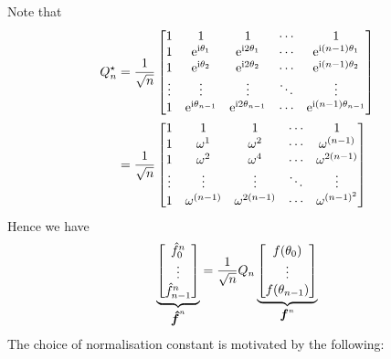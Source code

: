 Note that
\begin{align*}
Q_n^\ensuremath{\star} &= {1 \over \sqrt{n}} \begin{bmatrix}
1 & 1 & 1&  \ensuremath{\cdots} & 1 \\
1 & {\rm e}^{{\rm i} \ensuremath{\theta}_1} & {\rm e}^{{\rm i} 2 \ensuremath{\theta}_1} & \ensuremath{\cdots} & {\rm e}^{{\rm i} (n-1) \ensuremath{\theta}_1} \\
1 &  {\rm e}^{{\rm i} \ensuremath{\theta}_2}  & {\rm e}^{{\rm i} 2 \ensuremath{\theta}_2} & \ensuremath{\cdots} & {\rm e}^{{\rm i} (n-1)\ensuremath{\theta}_2} \\
\ensuremath{\vdots} & \ensuremath{\vdots} & \ensuremath{\vdots} & \ensuremath{\ddots} & \ensuremath{\vdots} \\
1 & {\rm e}^{{\rm i} \ensuremath{\theta}_{n-1}} & {\rm e}^{{\rm i} 2 \ensuremath{\theta}_{n-1}} & \ensuremath{\cdots} & {\rm e}^{{\rm i} (n-1) \ensuremath{\theta}_{n-1}}
\end{bmatrix} \\
&= {1 \over \sqrt{n}} \begin{bmatrix}
1 & 1 & 1&  \ensuremath{\cdots} & 1 \\
1 & \ensuremath{\omega}^{1} & \ensuremath{\omega}^{2} & \ensuremath{\cdots} & \ensuremath{\omega}^{(n-1)}\\
1 & \ensuremath{\omega}^{2} & \ensuremath{\omega}^{4} & \ensuremath{\cdots} & \ensuremath{\omega}^{2(n-1)}\\
\ensuremath{\vdots} & \ensuremath{\vdots} & \ensuremath{\vdots} & \ensuremath{\ddots} & \ensuremath{\vdots} \\
1 & \ensuremath{\omega}^{(n-1)} & \ensuremath{\omega}^{2(n-1)} & \ensuremath{\cdots} & \ensuremath{\omega}^{(n-1)^2}
\end{bmatrix}
\end{align*}
Hence we have
\[
\underbrace{\begin{bmatrix} \hat f_0^n \\ \vdots \\ \hat f_{n-1}^n \end{bmatrix}}_{{\mbox{\boldmath$\hat f$\unboldmath}}^n} =
{1 \over \sqrt{n}} Q_n \underbrace{\begin{bmatrix} f(\theta_0) \\ \vdots \\ f(\theta_{n-1}) \end{bmatrix}}_{\bm{{\mbox{\boldmath$f$\unboldmath}}}^n}
\]
The choice of normalisation constant is motivated by the following:


